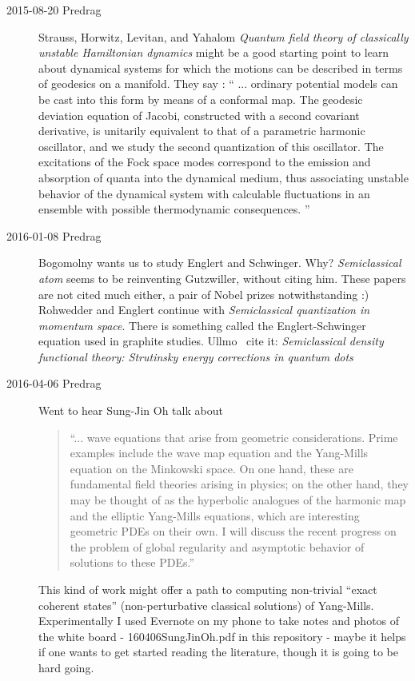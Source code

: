 \begin{description}
\item[2015-08-20 Predrag]
Strauss, Horwitz, Levitan, and Yahalom
{\em Quantum field theory of classically unstable {Hamiltonian} dynamics}
might be a good starting point to learn about dynamical systems for which
the motions can be described in terms of geodesics on a manifold. They
say : ``
... ordinary potential models can be cast into this form by means of a
conformal map. The geodesic deviation equation of Jacobi, constructed
with a second covariant derivative, is unitarily equivalent to that of a
parametric harmonic oscillator, and we study the second quantization of
this oscillator. The excitations of the Fock space modes correspond to
the emission and absorption of quanta into the dynamical medium, thus
associating unstable behavior of the dynamical system with calculable
fluctuations in an ensemble with possible thermodynamic consequences.
''

\item[2016-01-08 Predrag]
Bogomolny wants us to study Englert and
Schwinger. Why?
 {\em Semiclassical atom} seems to be reinventing
Gutzwiller, without citing him. These papers are not cited much either, a
pair of Nobel prizes notwithstanding :) Rohwedder and
Englert continue with {\em Semiclassical quantization in
momentum space}. There is something called the Englert-Schwinger equation
used in graphite studies. Ullmo~\etal{} cite it:
{\em Semiclassical density functional theory: {Strutinsky} energy
corrections in quantum dots}

\item[2016-04-06 Predrag]
Went to hear
{Sung-Jin Oh} talk about

\begin{quote}
``... wave equations that arise from geometric
considerations. Prime examples include the wave map equation and
the Yang-Mills equation on the Minkowski space. On one hand, these
are fundamental field theories arising in physics; on the other hand,
they may be thought of as the hyperbolic analogues of the harmonic map
and the elliptic Yang-Mills equations, which are interesting geometric
PDEs on their own. I will discuss the recent progress on the problem of
global regularity and asymptotic behavior of solutions to these PDEs.''
\end{quote}

This kind of work might offer a path to computing non-trivial ``exact
coherent states'' (non-perturbative classical solutions) of Yang-Mills.
Experimentally I used Evernote on my phone to take notes and photos of
the white board -
 {160406SungJinOh.pdf} in this repository -
maybe it helps if one wants to get started reading the literature, though
it is going to be hard going.


\end{description}
